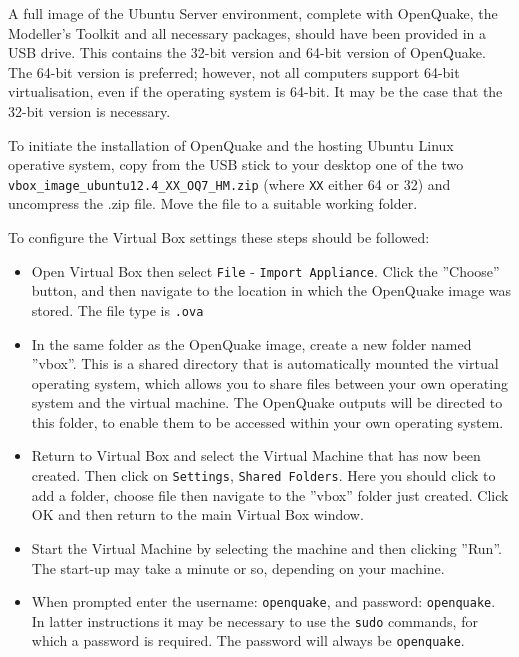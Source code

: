 A full image of the Ubuntu Server environment, complete with OpenQuake, 
the Modeller's Toolkit and all necessary packages, should have been 
provided in a USB drive. This contains the 32-bit version and 64-bit 
version of OpenQuake. The 64-bit version is preferred; however, not all 
computers support 64-bit virtualisation, even if the operating system is 
64-bit. It may be the case that the 32-bit version is necessary.

To initiate the installation of OpenQuake and the hosting Ubuntu Linux 
operative system, copy from the USB stick to your desktop one of the two 
\texttt{vbox\_image\_ubuntu12.4\-\_XX\-\_OQ7\-\_HM.zip} (where \verb=XX= either 64 
or 32) and uncompress the .zip file. Move the file to a suitable working 
folder.

To configure the Virtual Box settings these steps should be followed:
\begin{itemize}
\item Open Virtual Box then select \verb=File= - \verb=Import Appliance=. 
    Click the ''Choose'' button, and then navigate to the location in which 
    the OpenQuake image was stored. The file type is \verb=.ova=
\item In the same folder as the OpenQuake image, create a new folder 
    named ''vbox''. This is a shared directory that is automatically 
    mounted the virtual operating system, which allows you to share files 
    between your own operating system and the virtual machine. The OpenQuake 
    outputs will be directed to this folder, to enable them to be accessed
    within your own operating system.
\item Return to Virtual Box and select the Virtual Machine that has now 
    been created. Then click on \verb=Settings=, \verb=Shared Folders=. 
    Here you should click to add a folder, choose file then navigate to 
    the ''vbox'' folder just created. Click OK and then return to the 
    main Virtual Box window.
\item Start the Virtual Machine by selecting the machine and then 
    clicking ''Run''. The start-up may take a minute or so, depending 
    on your machine.
\item When prompted enter the username: \verb=openquake=, and password:
    \verb=openquake=. In latter instructions it may be necessary to use 
    the \verb=sudo= commands, for which a password is required. 
    The password will always be \verb=openquake=.

\end{itemize}
